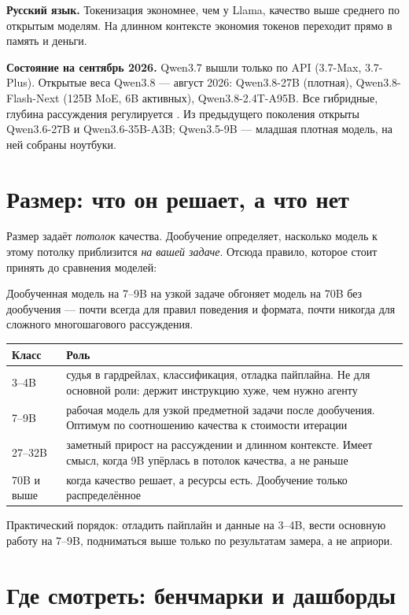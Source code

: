\documentclass[11pt,a4paper]{article}
\begin{document}
\textbf{Русский язык.} Токенизация экономнее, чем у Llama, качество выше
среднего по открытым моделям. На длинном контексте экономия токенов
переходит прямо в память и деньги.

\textbf{Состояние на сентябрь 2026.} Qwen3.7 вышли только по API
(3.7-Max, 3.7-Plus). Открытые веса Qwen3.8 --- август 2026: Qwen3.8-27B
(плотная), Qwen3.8-Flash-Next (125B MoE, 6B активных),
Qwen3.8-2.4T-A95B. Все гибридные, глубина рассуждения регулируется
. Из предыдущего поколения открыты Qwen3.6-27B
и Qwen3.6-35B-A3B; Qwen3.5-9B --- младшая плотная модель, на ней
собраны ноутбуки.

\section{Размер: что он решает, а что нет}

Размер задаёт \emph{потолок} качества. Дообучение определяет, насколько
модель к этому потолку приблизится \emph{на вашей задаче}. Отсюда правило,
которое стоит принять до сравнения моделей:

\begin{keybox}
Дообученная модель на 7--9B на узкой задаче обгоняет модель на 70B без
дообучения — почти всегда для правил поведения и формата, почти никогда
для сложного многошагового рассуждения.
\end{keybox}

\begin{tabular}{@{}lp{10.6cm}@{}}
\toprule
\textbf{Класс} & \textbf{Роль} \\
\midrule
3--4B & судья в гардрейлах, классификация, отладка пайплайна. Не для
основной роли: держит инструкцию хуже, чем нужно агенту \\[0.3em]
7--9B & рабочая модель для узкой предметной задачи после дообучения.
Оптимум по соотношению качества к стоимости итерации \\[0.3em]
27--32B & заметный прирост на рассуждении и длинном контексте. Имеет
смысл, когда 9B упёрлась в потолок качества, а не раньше \\[0.3em]
70B и выше & когда качество решает, а ресурсы есть. Дообучение только
распределённое \\
\bottomrule
\end{tabular}

Практический порядок: отладить пайплайн и данные на 3--4B, вести
основную работу на 7--9B, подниматься выше только по результатам замера,
а не априори.

\section{Где смотреть: бенчмарки и дашборды}
\end{document}
